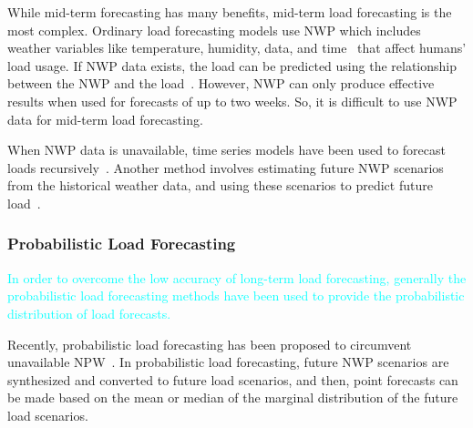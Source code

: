 \documentclass[journal]{IEEEtran} %
\begin{document}
While mid-term forecasting has many benefits, mid-term load forecasting is the most complex. Ordinary load forecasting models use NWP which includes weather variables like temperature, humidity, data, and time~\cite{xie2016temperature} that affect humans' load usage. If NWP data exists, the load can be predicted using the relationship between the NWP and the load~\cite{bacher2013short}. However, NWP can only produce effective results when used for forecasts of up to two weeks. So, it is difficult to use NWP data for mid-term load forecasting. 




When NWP data is unavailable, time series models have been used to forecast loads recursively~\cite{TIMESERIES}. Another method involves estimating future NWP scenarios from the historical weather data, and using these scenarios to predict future load~\cite{xie2016temperature}. 







\subsubsection{Probabilistic Load Forecasting}
\textcolor{cyan}{In order to overcome the low accuracy of long-term load forecasting, generally the probabilistic load forecasting methods have been used to provide the probabilistic distribution of load forecasts.}


Recently, probabilistic load forecasting has been proposed to circumvent unavailable NPW~\cite{xie2016temperature}. In probabilistic load forecasting, future NWP scenarios are synthesized and converted to future load scenarios, and then, point forecasts can be made based on the mean or median of the marginal distribution of the future load scenarios.
\end{document}
